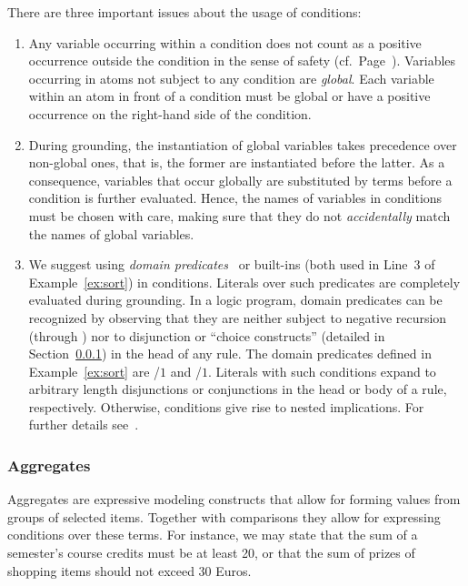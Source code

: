 \begin{note}\label{note:domain}
There are three important issues about the usage of conditions:
\begin{enumerate}
%
\item
Any variable occurring within a condition
does not count as a positive occurrence outside the condition
in the sense of safety (cf.\ Page~\pageref{pg:safe}).
Variables occurring in atoms not subject to any condition are \emph{global}.
Each variable within an atom in front of a condition
must be global or have a positive occurrence on the right-hand side of
the condition.
%
\item
During grounding,
the instantiation of global variables takes precedence over non-global ones,
that is, the former are instantiated before the latter.
As a consequence, variables that occur globally are substituted by terms
before a condition is further evaluated.
Hence, the names of variables in conditions must be chosen with care,
making sure that they do not \emph{accidentally} match the names of global variables.
%
\item
We suggest using \emph{domain predicates}~\cite{lparseManual}
or built-ins (both used in Line~3  of Example~\ref{ex:sort})
in conditions.
%
\label{pg:domain}%
Literals over such predicates are completely evaluated during grounding.
In a logic program, domain predicates can be recognized by observing
that they are neither subject to negative recursion (through )
nor to disjunction or ``choice constructs'' (detailed in Section~\ref{subsec:gringo:aggregate})
in the head of any rule.
The domain predicates defined in Example~\ref{ex:sort} are
/$1$ and /$1$.
Literals with such conditions expand to arbitrary length disjunctions or conjunctions in the head or body of a rule, respectively.
Otherwise, conditions give rise to nested implications.
For further details see~\cite{haliya14a}.
\end{enumerate}
\end{note}

\subsubsection{Aggregates}\label{subsec:gringo:aggregate}

Aggregates are expressive modeling constructs that allow for forming values from groups of selected items.
Together with comparisons they allow for expressing conditions over these terms.
For instance, we may state that the sum of a semester's course credits must be at least 20,
or that the sum of prizes of shopping items should not exceed 30 Euros.

